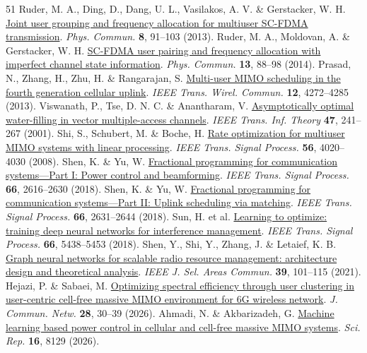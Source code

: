 \documentclass[10pt,letterpaper]{article}
\begin{document}
\begin{thebibliography}{51}
 Ruder, M. A., Ding, D., Dang, U. L., Vasilakos, A. V. \& Gerstacker, W. H. \href{https://doi.org/10.1016/j.phycom.2013.02.004}{Joint user grouping and frequency allocation for multiuser SC-FDMA transmission}. \emph{Phys. Commun.} \textbf{8}, 91–103 (2013).
 Ruder, M. A., Moldovan, A. \& Gerstacker, W. H. \href{https://doi.org/10.1016/j.phycom.2014.10.001}{SC-FDMA user pairing and frequency allocation with imperfect channel state information}. \emph{Phys. Commun.} \textbf{13}, 88–98 (2014).
 Prasad, N., Zhang, H., Zhu, H. \& Rangarajan, S. \href{https://doi.org/10.1109/TWC.2013.072513.120734}{Multi-user MIMO scheduling in the fourth generation cellular uplink}. \emph{IEEE Trans. Wirel. Commun.} \textbf{12}, 4272–4285 (2013).
 Viswanath, P., Tse, D. N. C. \& Anantharam, V. \href{https://doi.org/10.1109/18.904525}{Asymptotically optimal water-filling in vector multiple-access channels}. \emph{IEEE Trans. Inf. Theory} \textbf{47}, 241–267 (2001).
 Shi, S., Schubert, M. \& Boche, H. \href{https://doi.org/10.1109/TSP.2008.924796}{Rate optimization for multiuser MIMO systems with linear processing}. \emph{IEEE Trans. Signal Process.} \textbf{56}, 4020–4030 (2008).
 Shen, K. \& Yu, W. \href{https://doi.org/10.1109/TSP.2018.2812733}{Fractional programming for communication systems—Part I: Power control and beamforming}. \emph{IEEE Trans. Signal Process.} \textbf{66}, 2616–2630 (2018).
 Shen, K. \& Yu, W. \href{https://doi.org/10.1109/TSP.2018.2812748}{Fractional programming for communication systems—Part II: Uplink scheduling via matching}. \emph{IEEE Trans. Signal Process.} \textbf{66}, 2631–2644 (2018).
 Sun, H. et al. \href{https://doi.org/10.1109/TSP.2018.2866382}{Learning to optimize: training deep neural networks for interference management}. \emph{IEEE Trans. Signal Process.} \textbf{66}, 5438–5453 (2018).
 Shen, Y., Shi, Y., Zhang, J. \& Letaief, K. B. \href{https://doi.org/10.1109/JSAC.2020.3036965}{Graph neural networks for scalable radio resource management: architecture design and theoretical analysis}. \emph{IEEE J. Sel. Areas Commun.} \textbf{39}, 101–115 (2021).
 Hejazi, P. \& Sabaei, M. \href{https://doi.org/10.23919/JCN.2025.000085}{Optimizing spectral efficiency through user clustering in user-centric cell-free massive MIMO environment for 6G wireless network}. \emph{J. Commun. Netw.} \textbf{28}, 30–39 (2026).
 Ahmadi, N. \& Akbarizadeh, G. \href{https://doi.org/10.1038/s41598-026-38685-3}{Machine learning based power control in cellular and cell-free massive MIMO systems}. \emph{Sci. Rep.} \textbf{16}, 8129 (2026).

\end{thebibliography}
\end{document}
